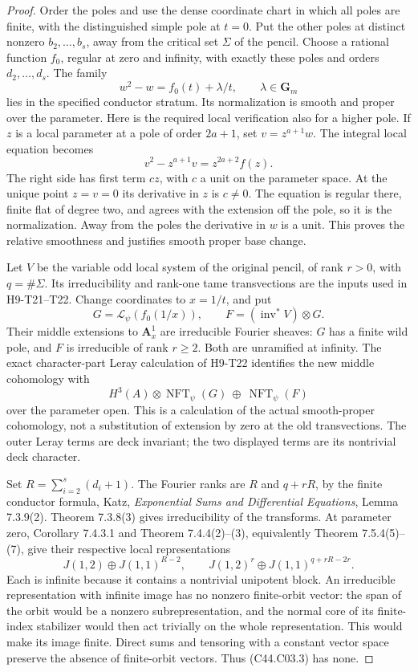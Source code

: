 \documentclass[11pt]{article}
\theoremstyle{remark}\newtheorem{remark}[theorem]{Remark}
\begin{document}
\begin{proof}
Order the poles and use the dense coordinate chart in which all poles
are finite, with the distinguished simple pole at $t=0$. Put the other
poles at distinct nonzero $b_2,\ldots,b_s$, away from the critical set
$\Sigma$ of the pencil. Choose a rational function $f_0$, regular at zero
and infinity, with exactly these poles and orders $d_2,\ldots,d_s$.
The family
\[
                  w^2-w=f_0(t)+\lambda/t,
                  \qquad \lambda\in\mathbf G_m
 \tag{C44.C03.2}
\]
lies in the specified conductor stratum. Its normalization is smooth
and proper over the parameter. Here is the required local verification
also for a higher pole. If $z$ is a local parameter at a pole of order
$2a+1$, set $v=z^{a+1}w$. The integral local equation becomes
\[
 v^2-z^{a+1}v=z^{2a+2}f(z).
\]
The right side has first term $c z$, with $c$ a unit on the parameter
space. At the unique point $z=v=0$ its derivative in $z$ is $c\ne0$.
The equation is regular there, finite flat of degree two, and agrees
with the extension off the pole, so it is the normalization. Away from
the poles the derivative in $w$ is a unit. This proves the relative
smoothness and justifies smooth proper base change.

Let $V$ be the variable odd local system of the original pencil,
of rank $r>0$, with $q=\#\Sigma$. Its irreducibility and rank-one tame
transvections are the inputs used in H9-T21--T22. Change coordinates
to $x=1/t$, and put
\[
 G=\mathcal L_\psi(f_0(1/x)),\qquad
 F=(\operatorname{inv}^*V)\otimes G.
\]
Their middle extensions to $\mathbf A^1_x$ are irreducible Fourier
sheaves: $G$ has a finite wild pole, and $F$ is irreducible of rank
$r\ge2$. Both are unramified at infinity. The exact character-part
Leray calculation of H9-T22 identifies the new middle cohomology
with
\[
 H^3(A)\otimes\operatorname{NFT}_\psi(G)
       \ \oplus\ \operatorname{NFT}_\psi(F)
 \tag{C44.C03.3}
\]
over the parameter open. This is a calculation of the actual
smooth-proper cohomology, not a substitution of extension by zero at
the old transvections. The outer Leray terms are deck invariant; the
two displayed terms are its nontrivial deck character.

Set $R=\sum_{i=2}^s(d_i+1)$. The Fourier ranks are $R$ and $q+rR$,
by the finite conductor formula, Katz, \emph{Exponential Sums and
Differential Equations}, Lemma 7.3.9(2). Theorem 7.3.8(3) gives
irreducibility of the transforms. At parameter zero, Corollary
7.4.3.1 and Theorem 7.4.4(2)--(3), equivalently Theorem 7.5.4(5)--(7),
give their respective local representations
\[
 J(1,2)\oplus J(1,1)^{R-2},\qquad
 J(1,2)^{r}\oplus J(1,1)^{q+rR-2r}.
 \tag{C44.C03.4}
\]
Each is infinite because it contains a nontrivial unipotent block.
An irreducible representation with infinite image has no nonzero
finite-orbit vector: the span of the orbit would be a nonzero
subrepresentation, and the normal core of its finite-index stabilizer
would then act trivially on the whole representation. This would make
its image finite. Direct sums and tensoring with a constant vector
space preserve the absence of finite-orbit vectors. Thus (C44.C03.3)
has none.


\end{proof}
\end{document}
